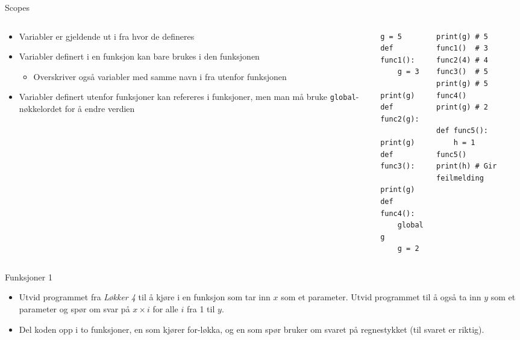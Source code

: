 \documentclass[screen, aspectratio=169]{beamer}
\begin{document}
\begin{frame}[fragile]{Scopes}
	\begin{columns}
		\begin{column}{.5\textwidth}
			\begin{itemize}
				\item Variabler er gjeldende ut i fra hvor de defineres
				\item Variabler definert i en funksjon kan bare brukes i den funksjonen
				\begin{itemize}
					\item Overskriver også variabler med samme navn i fra utenfor funksjonen
				\end{itemize}
				\item Variabler definert utenfor funksjoner kan refereres i funksjoner, men man må bruke \lstinline|global|-nøkkelordet for å endre verdien
			\end{itemize}
		\end{column}
		\begin{column}{.2\textwidth}
			\begin{lstlisting}
g = 5
def func1():
	g = 3
	print(g)
def func2(g):
	print(g)
def func3():
	print(g)
def func4():
	global g
	g = 2
			\end{lstlisting}
		\end{column}
		\begin{column}{.3\textwidth}
			\begin{lstlisting}
print(g) # 5
func1()  # 3
func2(4) # 4
func3()  # 5
print(g) # 5
func4()
print(g) # 2

def func5():
	h = 1
func5()
print(h) # Gir feilmelding
			\end{lstlisting}
		\end{column}
	\end{columns}
\end{frame}

\begin{frame}{Funksjoner 1}
	\begin{itemize}
		\item<+-> Utvid programmet fra \emph{Løkker 4} til å kjøre i en funksjon som tar inn $x$ som et parameter. Utvid programmet til å også ta inn $y$ som et parameter og spør om svar på $x\times i$ for alle $i$ fra 1 til $y$.
		\item<+-> Del koden opp i to funksjoner, en som kjører for-løkka, og en som spør bruker om svaret på regnestykket (til svaret er riktig).
	\end{itemize}
\end{frame}
\end{document}
